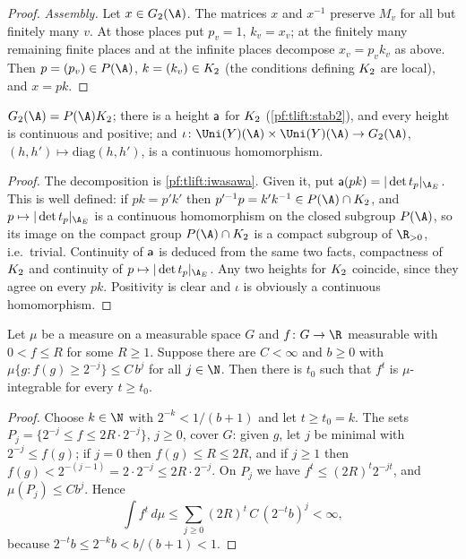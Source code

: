 \begin{proof}
\emph{Assembly.} Let $x\in G_2(\A)$. The matrices $x$ and $x^{-1}$ preserve $M_v$ for all but finitely many $v$. At those
places put $p_v=1$, $k_v=x_v$; at the finitely many remaining finite places and at the infinite places decompose
$x_v=p_vk_v$ as above. Then $p=(p_v)\in P(\A)$, $k=(k_v)\in K_2$ (the conditions defining $K_2$ are local), and $x=pk$.
\end{proof}

\begin{proposition}\label{pf:tlift:hgtex}
$G_2(\A)=P(\A)\tliftK$; there is a height $\mathsf{a}$ for $K_2$ (\cref{pf:tlift:stab2}), and every height
is continuous and positive; and $\iota\colon\Uni(Y)(\A)\times\Uni(Y)(\A)\to G_2(\A)$,
$(h,h')\mapsto\mathrm{diag}(h,h')$, is a continuous homomorphism.
\end{proposition}

\begin{proof}
The decomposition is \cref{pf:tlift:iwasawa}. Given it, put
$\tliftht(pk)=|\det t_p|_{\tliftAE}$. This is well defined: if $pk=p'k'$ then
$p'^{-1}p=k'k^{-1}\in P(\A)\cap\tliftK$, and $p\mapsto|\det t_p|_{\tliftAE}$ is a continuous homomorphism on the
closed subgroup $P(\A)$, so its image on the compact group $P(\A)\cap\tliftK$ is a compact subgroup of
$\R_{>0}$, i.e.\ trivial. Continuity of $\mathsf{a}$
is deduced from the same two facts, compactness of $K_2$ and continuity of $p\mapsto|\det t_p|_{\tliftAE}$.
Any two heights for $K_2$ coincide, since they agree on every $pk$. Positivity is clear and $\iota$ is
obviously a continuous homomorphism.
\end{proof}

\begin{lemma}\label{pf:tlift:count}
Let $\mu$ be a measure on a measurable space $G$ and $f\colon G\to\R$ measurable with $0<f\le R$ for some
$R\ge1$. Suppose there are $C<\infty$ and $b\ge0$ with $\mu\{g:f(g)\ge2^{-j}\}\le C\,b^j$ for all $j\in\N$.
Then there is $t_0$ such that $f^t$ is $\mu$-integrable for every $t\ge t_0$.
\end{lemma}

\begin{proof}
Choose $k\in\N$ with $2^{-k}<1/(b+1)$ and let $t\ge t_0=k$. The sets $P_j=\{2^{-j}\le f\le2R\cdot2^{-j}\}$,
$j\ge0$, cover $G$: given $g$, let $j$ be minimal with $2^{-j}\le f(g)$; if $j=0$ then $f(g)\le R\le 2R$,
and if $j\ge1$ then $f(g)<2^{-(j-1)}=2\cdot2^{-j}\le2R\cdot2^{-j}$. On $P_j$ we have
$f^t\le(2R)^t2^{-jt}$, and $\mu(P_j)\le Cb^j$. Hence
\[
  \int f^t\,d\mu\le\sum_{j\ge0}(2R)^t\,C\,(2^{-t}b)^j<\infty,
\]
because $2^{-t}b\le2^{-k}b<b/(b+1)<1$.
\end{proof}

